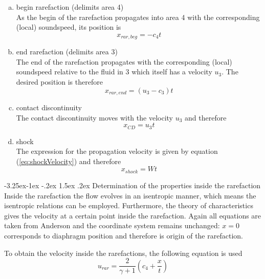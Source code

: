 \documentclass{report}
\makeatletter
\renewcommand\paragraph{\@startsection{paragraph}{4}{\z@}%
  {-3.25ex\@plus -1ex \@minus -.2ex}%
  {1.5ex \@plus .2ex}%
  {\normalfont\normalsize\bfseries}}
\makeatother
\begin{document}
\begin{enumerate} [(a)]

  \item begin rarefaction (delimits area 4) \\
As the begin of the rarefaction propagates into area 4 with the corresponding (local) soundspeed, its position is 
\begin{equation}
 x_{rar,beg}=-c_4 t
\end{equation}

  \item end rarefaction (delimits area 3) \\
The end of the rarefaction propagates with the corresponding (local) soundspeed relative to the fluid in 3 which itself has a velocity $u_3$. The desired position is therefore
\begin{equation}
 x_{rar,end}=(u_3-c_3) t
\end{equation}

  \item contact discontinuity \\
The contact discontinuity moves with the velocity $u_3$ and therefore
\begin{equation}
 x_{CD}=u_3 t
\end{equation}

  \item shock \\
  The expression for the propagation velocity is given by equation (\ref{eq:shockVelocity}) and therefore
\begin{equation}
 x_{shock}=W t
\end{equation}

\end{enumerate}

\paragraph{Determination of the properties inside the rarefaction}
Inside the rarefaction the flow evolves in an isentropic manner, which means the isentropic relations can be employed. Furthermore, the theory of characteristics gives the velocity at a certain point inside the rarefaction. Again all equations are taken from Anderson \cite{Anderson2002} and the coordinate system remains unchanged: $x=0$ corresponds to diaphragm position and therefore is origin of the rarefaction.

To obtain the velocity inside the rarefactions, the following equation is used
\begin{equation}
 u_{rar}=\frac{2}{\gamma+1}\left(c_4+\frac{x}{t}\right)
\end{equation}
\end{document}
